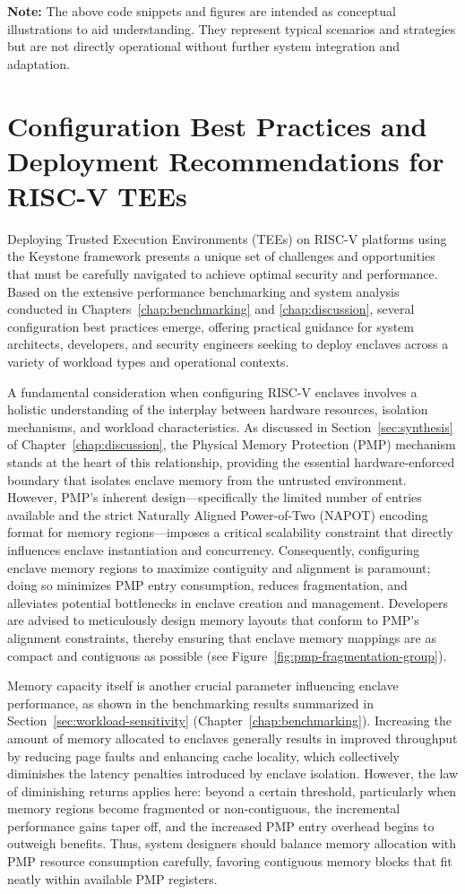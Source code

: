 \textbf{Note:} The above code snippets and figures are intended as conceptual illustrations to aid understanding. They represent typical scenarios and strategies but are not directly operational without further system integration and adaptation.

\section{Configuration Best Practices and Deployment Recommendations for RISC-V TEEs}
\label{sec:best-practices}
Deploying Trusted Execution Environments (TEEs) on RISC-V platforms using the Keystone framework presents a unique set of challenges and opportunities that must be carefully navigated to achieve optimal security and performance. Based on the extensive performance benchmarking and system analysis conducted in Chapters~\ref{chap:benchmarking} and \ref{chap:discussion}, several configuration best practices emerge, offering practical guidance for system architects, developers, and security engineers seeking to deploy enclaves across a variety of workload types and operational contexts.

A fundamental consideration when configuring RISC-V enclaves involves a holistic understanding of the interplay between hardware resources, isolation mechanisms, and workload characteristics. As discussed in Section~\ref{sec:synthesis} of Chapter~\ref{chap:discussion}, the Physical Memory Protection (PMP) mechanism stands at the heart of this relationship, providing the essential hardware-enforced boundary that isolates enclave memory from the untrusted environment. However, PMP’s inherent design—specifically the limited number of entries available and the strict Naturally Aligned Power-of-Two (NAPOT) encoding format for memory regions—imposes a critical scalability constraint that directly influences enclave instantiation and concurrency. Consequently, configuring enclave memory regions to maximize contiguity and alignment is paramount; doing so minimizes PMP entry consumption, reduces fragmentation, and alleviates potential bottlenecks in enclave creation and management. Developers are advised to meticulously design memory layouts that conform to PMP’s alignment constraints, thereby ensuring that enclave memory mappings are as compact and contiguous as possible (see Figure~\ref{fig:pmp-fragmentation-group}).

Memory capacity itself is another crucial parameter influencing enclave performance, as shown in the benchmarking results summarized in Section~\ref{sec:workload-sensitivity} (Chapter~\ref{chap:benchmarking}). Increasing the amount of memory allocated to enclaves generally results in improved throughput by reducing page faults and enhancing cache locality, which collectively diminishes the latency penalties introduced by enclave isolation. However, the law of diminishing returns applies here: beyond a certain threshold, particularly when memory regions become fragmented or non-contiguous, the incremental performance gains taper off, and the increased PMP entry overhead begins to outweigh benefits. Thus, system designers should balance memory allocation with PMP resource consumption carefully, favoring contiguous memory blocks that fit neatly within available PMP registers.

